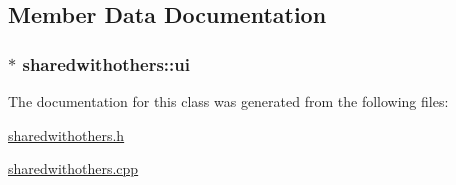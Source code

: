 \subsection{Member Data Documentation}
\hypertarget{classsharedwithothers_a07ff34832f6260085f6dd81f6ed07bbe}{
\subsubsection[{ui}]{$\ast$ sharedwithothers\-::ui\hspace{0.3cm}{\ttfamily [private]}}}\label{classsharedwithothers_a07ff34832f6260085f6dd81f6ed07bbe}


The documentation for this class was generated from the following files\-:\begin{DoxyCompactItemize}
\item 
\hyperlink{sharedwithothers_8h}{sharedwithothers.\-h}\item 
\hyperlink{sharedwithothers_8cpp}{sharedwithothers.\-cpp}\end{DoxyCompactItemize}
